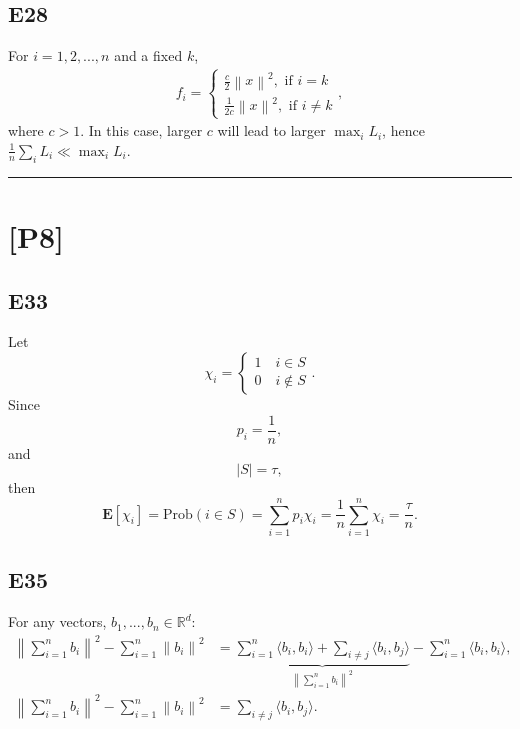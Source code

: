 \documentclass[12pt]{article}
\begin{document}
\subsection*{E28}
For $i=1,2,...,n$ and a fixed $k$,
\begin{equation*}
    \begin{split}
        f_i =
        \begin{cases}
            \frac{c}{2}\left\| x \right\|^2, \text{ if }i=k \\
            \frac{1}{2c}\left\| x \right\|^2, \text{ if }i \neq k
        \end{cases}
        ,
    \end{split}
\end{equation*}
where $c > 1$. In this case, larger $c$ will lead to larger $\max_i L_i$, hence $\frac{1}{n} \sum_i L_i \ll \max_i L_i$. 
\vspace{0.1cm}

\hrule
\vspace{0.1cm}
\section*{[P8]}
\subsection*{E33}
Let
\begin{equation*}
    \chi_i = 
    \begin{cases}
        1 \quad i \in S\\
        0 \quad i \notin S
    \end{cases}
    .
\end{equation*}
Since
\begin{equation*}
    p_i = \frac{1}{n},
\end{equation*}
and
\begin{equation*}
    |S| = \tau,
\end{equation*}
then 
\begin{equation*}
    \textbf{E}[\chi_i] = \text{Prob}(i \in S) = \sum^n_{i=1} p_i \chi_i = \frac{1}{n} \sum^n_{i=1} \chi_i = \frac{\tau}{n}.
\end{equation*}

\subsection*{E35}
For any vectors, $b_1, ..., b_n \in \mathbb{R}^d$:
\begin{equation*}
    \begin{split}
        \left\|\sum^n_{i=1} b_i \right\|^2 - \sum^n_{i=1}  \left\| b_i \right\|^2 &= \underbrace{\sum^n_{i=1} \langle b_i, b_i\rangle + \sum_{i \neq j} \langle b_i, b_j \rangle}_{\left\|\sum^n_{i=1} b_i \right\|^2} - \sum^n_{i=1} \langle b_i, b_i\rangle, \\
        \left\|\sum^n_{i=1} b_i \right\|^2 - \sum^n_{i=1}  \left\| b_i \right\|^2 &= \sum_{i \neq j} \langle b_i, b_j \rangle.
    \end{split}
\end{equation*}
\end{document}
